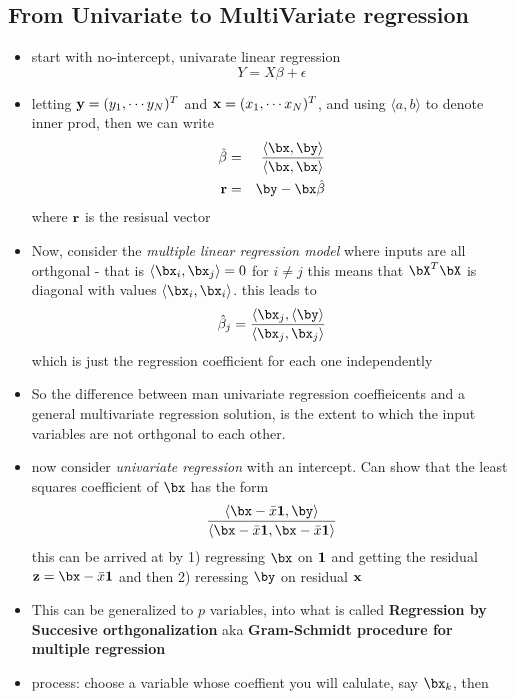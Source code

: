 \subsection{From Univariate to MultiVariate regression}
\begin{itemize}
  \item start with no-intercept, univarate linear regression 
    $$ Y = X\beta + \epsilon$$
  \item letting ${\bf y} = (y_1,\cdots y_N)^T$ and ${\bf x} = (x_1, \cdots x_N)^T$, and using $\langle a, b \rangle$ to denote inner prod, then we can write
    \begin{eqnarray}
      \hat{\beta} &=& \frac{\langle \bx, \by \rangle}{\langle \bx, \bx \rangle} \\
      {\bf r} &=&  \by - \bx \hat{\beta}
    \end{eqnarray}
    where ${\bf r}$ is the resisual vector
  \item Now, consider the \emph{multiple linear regression model} where inputs are all orthgonal - that is $\langle \bx_i, \bx_j \rangle = 0$ for $i\neq j$
    \subitem this means that $\bX^T\bX$ is diagonal with values $\langle \bx_i, \bx_i \rangle$.
    \subitem this leads to 
    $$ \hat{\beta}_j = \frac{\langle \bx_j, \langle \by \rangle}{\langle \bx_j, \bx_j \rangle} $$
    which is just the regression coefficient for each one independently
  \item So the difference between man univariate regression coeffieicents and a general multivariate regression solution, is the extent to which the input variables are not orthgonal to each other.
  \item now consider \emph{ univariate regression} with an intercept. Can show that the least squares coefficient of $\bx$ has the form
    $$ \frac{\langle\bx - \bar{x}{\bf 1}, \by \rangle}{\langle \bx - \bar{x}{\bf 1}, \bx - \bar{x}{\bf 1}\rangle} $$
	\subitem this can be arrived at by 1) regressing $\bx$ on ${\bf 1}$ and getting the residual ${\bf z} = \bx - \bar{x}{\bf 1}$ and then 2) reressing $\by$ on residual ${\bf x}$
      \item  This can be generalized to $p$ variables, into what is called {\bf Regression by Succesive orthgonalization} aka {\bf Gram-Schmidt procedure for multiple regression}
   \item process: choose a variable whose coeffient you will calulate, say $\bx_k$, then
     \begin{itemize}

\end{itemize}
\end{itemize}
